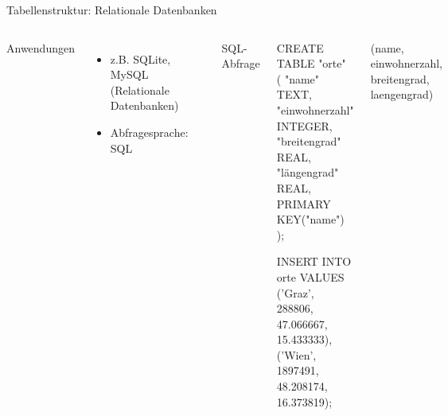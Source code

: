 \begin{frame}[fragile]{Tabellenstruktur: Relationale Datenbanken}
  \begin{columns}[T,onlytextwidth]
    Anwendungen
      \begin{itemize}\footnotesize
          \item z.B. SQLite, MySQL (Relationale Datenbanken) 
          \item Abfragesprache: SQL 
      \end{itemize}
      \bigskip 
      
      \begin{block}{}
        \includegraphics[width=0.97\textwidth]{img/tabelle.png}
      \end{block}


SQL-Abfrage
\begin{sqlcode}
CREATE TABLE "orte" (
 "name" TEXT,
 "einwohnerzahl" INTEGER,
 "breitengrad" REAL,
 "längengrad" REAL,
 PRIMARY KEY("name")
);

INSERT INTO orte 
VALUES 
('Graz', 288806, 47.066667, 15.433333), 
('Wien', 1897491, 48.208174, 16.373819);
\end{sqlcode}
\footnotesize
(name, einwohnerzahl, breitengrad, laengengrad) 

  \end{columns}
\end{frame}


